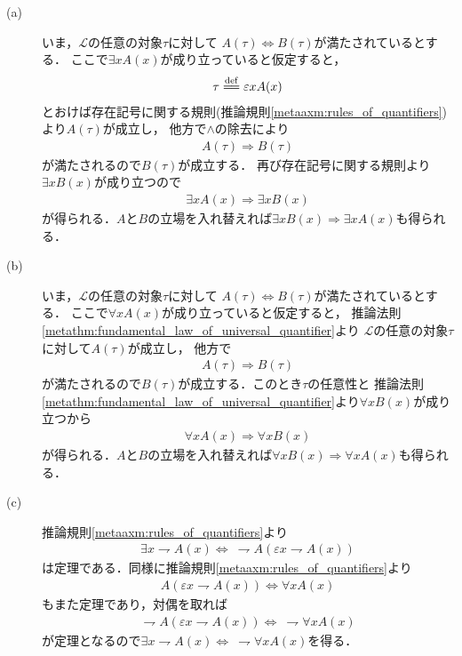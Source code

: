 	\begin{prf}\mbox{}
		\begin{description}
			\item[(a)]
				いま，$\mathcal{L}$の任意の対象$\tau$に対して
				$A(\tau) \Longleftrightarrow B(\tau)$が満たされているとする．
				ここで$\exists x A(x)$が成り立っていると仮定すると，
				\begin{align}
					\tau \defeq \varepsilon x A(x)
				\end{align}
				とおけば存在記号に関する規則(推論規則\ref{metaaxm:rules_of_quantifiers})より$A(\tau)$が成立し，
				他方で$\wedge$の除去により
				\begin{align}
					A(\tau) \Longrightarrow B(\tau)
				\end{align}
				が満たされるので$B(\tau)$が成立する．
				再び存在記号に関する規則より$\exists x B(x)$が成り立つので
				\begin{align}
					\exists x A(x) \Longrightarrow \exists x B(x)
				\end{align}
				が得られる．$A$と$B$の立場を入れ替えれば$\exists x B(x) \Longrightarrow \exists x A(x)$も得られる．
				
			\item[(b)]
				いま，$\mathcal{L}$の任意の対象$\tau$に対して
				$A(\tau) \Longleftrightarrow B(\tau)$が満たされているとする．
				ここで$\forall x A(x)$が成り立っていると仮定すると，
				推論法則\ref{metathm:fundamental_law_of_universal_quantifier}より
				$\mathcal{L}$の任意の対象$\tau$に対して$A(\tau)$が成立し，
				他方で
				\begin{align}
					A(\tau) \Longrightarrow B(\tau)
				\end{align}
				が満たされるので$B(\tau)$が成立する．このとき$\tau$の任意性と
				推論法則\ref{metathm:fundamental_law_of_universal_quantifier}より$\forall x B(x)$が成り立つから
				\begin{align}
					\forall x A(x) \Longrightarrow \forall x B(x)
				\end{align}
				が得られる．$A$と$B$の立場を入れ替えれば$\forall x B(x) \Longrightarrow \forall x A(x)$も得られる．
				
			\item[(c)]
				推論規則\ref{metaaxm:rules_of_quantifiers}より
				\begin{align}
					\exists x \rightharpoondown A(x) \Longleftrightarrow\ 
					\rightharpoondown A(\varepsilon x \rightharpoondown A(x))
				\end{align}
				は定理である．同様に推論規則\ref{metaaxm:rules_of_quantifiers}より
				\begin{align}
					A(\varepsilon x \rightharpoondown A(x)) \Longleftrightarrow \forall x A(x) 
				\end{align}
				もまた定理であり，対偶を取れば
				\begin{align}
					\rightharpoondown A(\varepsilon x \rightharpoondown A(x)) \Longleftrightarrow\ 
					\rightharpoondown \forall x A(x)
				\end{align}
				が定理となるので$\exists x \rightharpoondown A(x) \Longleftrightarrow\ \rightharpoondown \forall x A(x)$を得る．
			

\end{description}
\end{prf}

